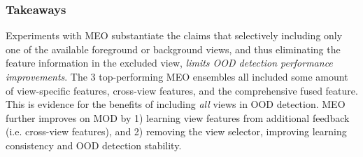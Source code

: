 \subsubsection{Takeaways}
\label{sec:propwork-meo-results-takeaway}
Experiments with MEO substantiate the claims that selectively including only one of the available foreground or background views, and thus eliminating the feature information in the excluded view, \emph{limits OOD detection performance improvements}. The 3 top-performing MEO ensembles all included some amount of view-specific features, cross-view features, and the comprehensive fused feature. This is evidence for the benefits of including \emph{all} views in OOD detection. MEO further improves on MOD by 1) learning view features from additional feedback (i.e. cross-view features), and 2) removing the view selector, improving learning consistency and OOD detection stability.

